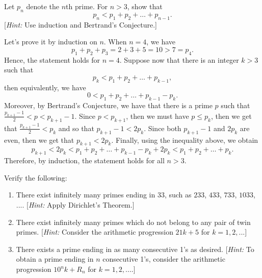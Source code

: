 \begin{exercise}
    Let $p_n$ denote the $n$th prime. For $n > 3$, show that
    $$p_n < p_1 + p_2 + \dots + p_{n-1}.$$
    [\textit{Hint:} Use induction and Bertrand's Conjecture.] \\
\end{exercise}

\begin{solution}
    Let's prove it by induction on $n$. When $n = 4$, we have
    $$p_1 + p_2 + p_3 = 2 + 3 + 5 = 10 > 7 = p_4.$$
    Hence, the statement holds for $n = 4$. Suppose now that there is an integer $k > 3$ such that
    $$p_k < p_1 + p_2 + \dots + p_{k-1},$$
    then equivalently, we have 
    $$0 < p_1 + p_2 + \dots + p_{k-1} - p_k.$$
    Moreover, by Bertrand's Conjecture, we have that there is a prime $p$ such that $\frac{p_{k+1} - 1}{2} < p < p_{k+1} - 1$. Since $p < p_{k+1}$, then we must have $p \leq p_k$, then we get that $\frac{p_{k+1} - 1}{2} < p_k$ and so that $p_{k+1} - 1 < 2p_k$. Since both $p_{k+1} - 1$ and $2p_k$ are even, then we get that $p_{k+1} < 2p_k$. Finally, using the inequality above, we obtain
    $$p_{k+1} < 2p_k < p_1 + p_2 + \dots + p_{k-1} - p_k + 2p_k < p_1 + p_2 + \dots + p_k.$$
    Therefore, by induction, the statement holds for all $n > 3$.\\
\end{solution}

\begin{exercise}
    Verify the following:
    \begin{enumerate}
        \item There exist infinitely many primes ending in $33$, such as $233$, $433$, $733$, $1033$, .... [\textit{Hint:} Apply Dirichlet's Theorem.]
        \item There exist infinitely many primes which do not belong to any pair of twin primes. [\textit{Hint:} Consider the arithmetic progression $21k + 5$ for $k = 1,2,$...]
        \item There exists a prime ending in as many consecutive 1's as desired. [\textit{Hint:} To obtain a prime ending in $n$ consecutive 1's, consider the arithmetic progression $10^nk + R_n$ for $k=1,2,....$]
    \end{enumerate}
\end{exercise}

